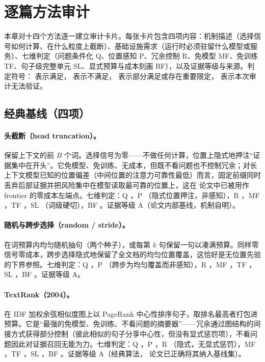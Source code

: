 \section{逐篇方法审计}
\label{sec:cards}

本章对十四个方法逐一建立审计卡片。每张卡片包含四项内容：机制描述（选择信号如何计算、在什么粒度上截断）、基础设施需求（运行时必须驻留什么模型或服务）、七维判定（问题条件化 Q、位置感知 P、冗余控制 R、免模型 MF、免训练 TF、句子级完整单元 SL、显式预算与成本刻画 BF），以及证据等级与来源。判定符号：\ck{} 表示满足，\no{} 表示不满足，\partl{} 表示部分满足或存在重要限定，\unk{} 表示本次审计无法验证。

\subsection{经典基线（四项）}

\paragraph{头截断（head truncation）。}
保留上下文的前 $B$ 个词。选择信号为零——不做任何计算，位置上隐式地押注``证据集中在开头''。它免模型、免训练、无成本，但既不看问题也不控制冗余；对长上下文模型已知的位置偏差（中间位置的注意力可靠性最低）而言，固定前缀同时丢弃后部证据并把风险集中在模型读取最可靠的位置上，这在 \sieve{} 论文中已被用作 frontier 的零成本左端点。七维判定：Q \no{}，P \partl{}（隐式位置押注，非感知），R \no{}，MF \ck{}，TF \ck{}，SL \no{}（词级硬切），BF \no{}。证据等级 A（论文内部基线，机制自明）。

\paragraph{随机与跨步选择（random / stride）。}
在词预算内均匀随机抽句（两个种子），或每第 $k$ 句保留一句以凑满预算。同样零信号零成本，跨步选择隐式地保留了全文档的均匀位置覆盖，这恰好是无位置先验的下界参照。七维判定：Q \no{}，P \no{}（跨步为均匀覆盖而非感知），R \no{}，MF \ck{}，TF \ck{}，SL \ck{}，BF \no{}。证据等级 A。

\paragraph{TextRank（2004）。}
在 IDF 加权余弦相似度图上以 PageRank 中心性排序句子，取排名最高者打包进预算。它是``最强的免模型、免训练、不看问题的摘要器''——冗余通过图结构的间接方式获得部分控制（彼此相似的句子分享中心性，但没有显式惩罚项），不看问题因此对证据召回无能为力。七维判定：Q \no{}，P \no{}，R \partl{}（隐式，无显式惩罚），MF \ck{}，TF \ck{}，SL \ck{}，BF \no{}。证据等级 A（经典算法，\sieve{} 论文已正确将其纳入基线集）。

